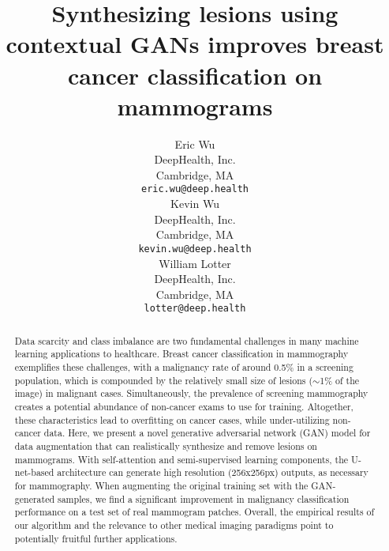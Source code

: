 \documentclass{article}
\title{Synthesizing lesions using contextual GANs improves breast cancer classification on mammograms}
\author{%
  Eric Wu \\
  DeepHealth, Inc.\\
  Cambridge, MA \\
  \texttt{eric.wu@deep.health} \\
   \And
     Kevin Wu \\
  DeepHealth, Inc.\\
  Cambridge, MA \\
  \texttt{kevin.wu@deep.health} \\
  \And
    William Lotter \\
  DeepHealth, Inc.\\
  Cambridge, MA \\
  \texttt{lotter@deep.health} \\
}
\begin{document}
\maketitle
\thispagestyle{empty}

\begin{abstract}
Data scarcity and class imbalance are two fundamental challenges in many machine learning applications to healthcare. Breast cancer classification in mammography exemplifies these challenges, with a malignancy rate of around 0.5\% in a screening population, which is compounded by the relatively small size of lesions ($\sim$1\% of the image) in malignant cases. Simultaneously, the prevalence of screening mammography creates a potential abundance of non-cancer exams to use for training. Altogether, these characteristics lead to overfitting on cancer cases, while under-utilizing non-cancer data. Here, we present a novel generative adversarial network (GAN) model for data augmentation that can realistically synthesize and remove lesions on mammograms. With self-attention and semi-supervised learning components, the U-net-based architecture can generate high resolution (256x256px) outputs, as necessary for mammography. When augmenting the original training set with the GAN-generated samples, we find a significant improvement in malignancy classification performance on a test set of real mammogram patches. Overall, the empirical results of our algorithm and the relevance to other medical imaging paradigms point to potentially fruitful further applications. 
\end{abstract}
\end{document}
